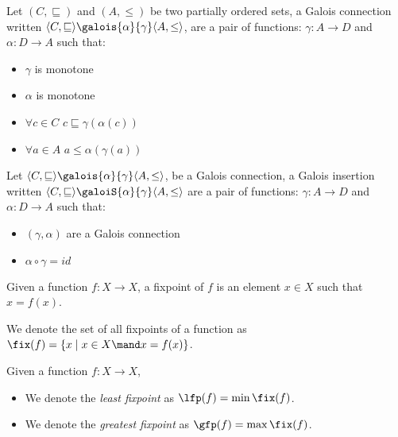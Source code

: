 \begin{definition}
  Let $(C, \sqsubseteq)$ and $(A, \leq)$ be two partially ordered sets, a 
  Galois connection written $\langle C, \sqsubseteq \rangle 
  \galois{\alpha}{\gamma} \langle A, \leq \rangle$, are a pair of functions:
  $\gamma : A \to D$ and $\alpha : D \to A$ such that:
  \begin{itemize}
    \item $\gamma$ is monotone
    \item $\alpha$ is monotone
    \item $\forall c \in C$ $c \sqsubseteq \gamma(\alpha(c))$
    \item $\forall a \in A$ $a \leq \alpha(\gamma(a))$
  \end{itemize}
\end{definition}

\begin{definition}
  Let $\langle C, \sqsubseteq \rangle \galois{\alpha}{\gamma} \langle A, \leq 
  \rangle$, be a Galois connection, a Galois insertion written 
  $\langle C, \sqsubseteq \rangle \galoiS{\alpha}{\gamma} \langle A, \leq \rangle$
  are a pair of functions: $\gamma : A \to D$ and $\alpha : D \to A$ such that:
  \begin{itemize}
    \item $(\gamma, \alpha)$ are a Galois connection
    \item $\alpha \circ \gamma = id$
  \end{itemize}
\end{definition}

\begin{definition}[Fixpoint]
  Given a function $f : X \to X$, a fixpoint of $f$ is an element $x \in X$ 
  such that $x = f(x)$.

  We denote the set of all fixpoints of a function as $\fix(f) = 
  \{ x \mid x \in X \mand x = f(x) \}$.
\end{definition}

\begin{definition}
  Given a function $f : X \to X$,
  \begin{itemize}
    \item We denote the \textit{least fixpoint} as $\lfp(f) = \min \fix(f)$.
    \item We denote the \textit{greatest fixpoint} as $\gfp(f) = \max \fix(f)$.
  \end{itemize}
\end{definition}

